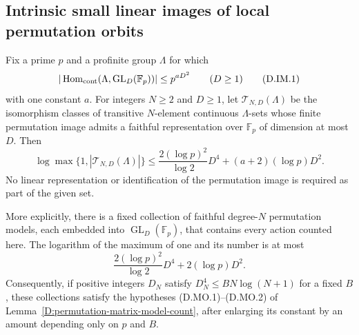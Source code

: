 \subsection{Intrinsic small linear images of local permutation orbits}

\begin{lemma}
\label{D:intrinsic-small-linear-permutation-images}
Fix a prime $p$ and a profinite group $\Lambda$ for which
\[
 |\operatorname{Hom}_{\rm cont}
       (\Lambda,\operatorname{GL}_D(\mathbb F_p))|
                      \le p^{aD^2}\qquad(D\ge1)          \tag{D.IM.1}
\]
with one constant $a$. For integers $N\ge2$ and $D\ge1$,
let $\mathcal T_{N,D}(\Lambda)$ be the isomorphism classes
of transitive $N$-element continuous $\Lambda$-sets whose
finite permutation image admits a faithful representation
over $\mathbb F_p$ of dimension at most $D$. Then
\[
 \log\max\{1,|\mathcal T_{N,D}(\Lambda)|\}
 \le \frac{2(\log p)^2}{\log2}D^4
                       +(a+2)(\log p)D^2.               \tag{D.IM.2}
\]
No linear representation or identification of the
permutation image is required as part of the given set.

More explicitly, there is a fixed collection of faithful
degree-$N$ permutation models, each embedded into
$\operatorname{GL}_D(\mathbb F_p)$, that contains every
action counted here. The logarithm of the maximum of
one and its number is at most
\[
            \frac{2(\log p)^2}{\log2}D^4
                              +2(\log p)D^2.             \tag{D.IM.3}
\]
Consequently, if positive integers $D_N$ satisfy
$D_N^4\le B N\log(N+1)$ for a fixed $B$, these
collections satisfy the hypotheses (D.MO.1)--(D.MO.2)
of Lemma~\ref{D:permutation-matrix-model-count}, after
enlarging its constant by an amount depending only
on $p$ and $B$.
\end{lemma}

